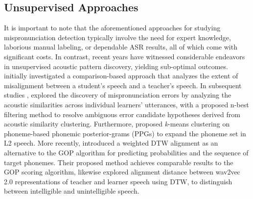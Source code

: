\documentclass[11pt]{article}
\begin{document}
\subsection{Unsupervised Approaches}
It is important to note that the aforementioned approaches for studying mispronunciation detection typically involve the need for expert knowledge, laborious manual labeling, or dependable ASR results, all of which come with significant costs. In contrast, recent years have witnessed considerable endeavors in unsupervised acoustic pattern discovery, yielding sub-optimal outcomes. \citet{6424254} initially investigated a comparison-based approach that analyzes the extent of misalignment between a student's speech and a teacher's speech. In subsequent studies \citet{lee2015mispronunciation, lee2016personalized}, explored the discovery of mispronunciation errors by analyzing the acoustic similarities across individual learners' utterances, with a proposed n-best filtering method to resolve ambiguous error candidate hypotheses derived from acoustic similarity clustering. Furthermore, \citet{mao2018unsupervised} proposed \textit{k}-means clustering on phoneme-based phonemic posterior-grams (PPGs) to expand the phoneme set in L2 speech. More recently, \citet{sini2023phone} introduced a weighted DTW alignment as an alternative to the GOP algorithm for predicting probabilities and the sequence of target phonemes. Their proposed method achieves comparable results to the GOP scoring algorithm, likewise \citet{anand2023unsupervised} explored alignment distance between wav2vec 2.0 representations of teacher and learner speech using DTW, to distinguish between intelligible and unintelligible speech.
\end{document}
